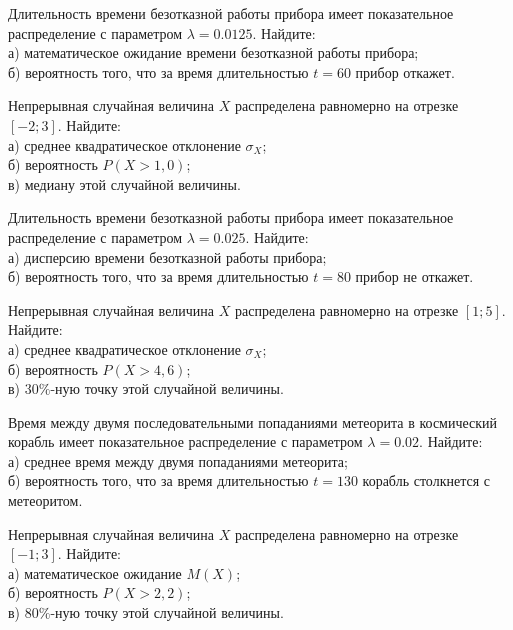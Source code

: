 \z Длительность времени безотказной работы прибора имеет показательное распределение с параметром $\lambda = 0.0125$. Найдите: \\ \quad а) математическое ожидание времени безотказной работы прибора; \\ \quad б) вероятность того, что за время длительностью $t = 60$ прибор  откажет.
 

\vfill

\newpage\setcounter{zad}{0}

\z Непрерывная случайная величина $X$ распределена равномерно на отрезке $[-2; 3]$. Найдите: \\ \quad а) среднее квадратическое отклонение $\sigma_X$; \\ \quad б) вероятность $P(X>1{,}0)$; \\ \quad в) медиану этой случайной величины.


\vfill

\z Длительность времени безотказной работы прибора имеет показательное распределение с параметром $\lambda = 0.025$. Найдите: \\ \quad а) дисперсию времени безотказной работы прибора; \\ \quad б) вероятность того, что за время длительностью $t = 80$ прибор не откажет.
 

\vfill

\newpage\setcounter{zad}{0}

\z Непрерывная случайная величина $X$ распределена равномерно на отрезке $[1; 5]$. Найдите: \\ \quad а) среднее квадратическое отклонение $\sigma_X$; \\ \quad б) вероятность $P(X>4{,}6)$; \\ \quad в) $30\%$-ную точку этой случайной величины.


\vfill

\z Время между двумя последовательными попаданиями метеорита в космический корабль имеет показательное распределение с параметром $\lambda = 0.02$. Найдите: \\ \quad а) среднее время между двумя попаданиями метеорита; \\ \quad б) вероятность того, что за время длительностью $t = 130$ корабль  столкнется с метеоритом.
 

\vfill

\newpage\setcounter{zad}{0}

\z Непрерывная случайная величина $X$ распределена равномерно на отрезке $[-1; 3]$. Найдите: \\ \quad а) математическое ожидание $M(X)$; \\ \quad б) вероятность $P(X>2{,}2)$; \\ \quad в) $80\%$-ную точку этой случайной величины.



